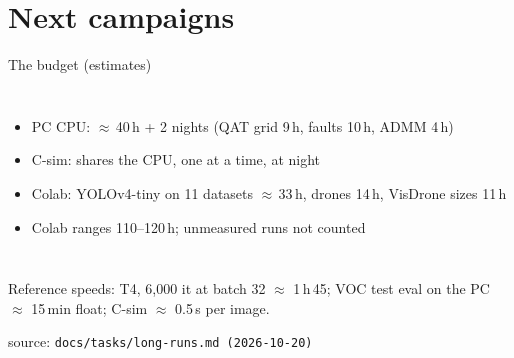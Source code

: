 \documentclass[aspectratio=169,11pt]{beamer}
\newcommand\src[1]{\par\vfill{\tiny\color{gray}source: \texttt{#1}}}
\newcommand\plan{\textcolor{orange!80!black}{\small(estimates)}}
\begin{document}
\section{Next campaigns}

\begin{frame}{The budget \plan}
  \begin{columns}[c]
    \centering
    \footnotesize
    \begin{itemize}
      \item PC CPU: $\approx$\,40\,h + 2 nights (QAT grid 9\,h, faults 10\,h, ADMM 4\,h)
      \item C-sim: shares the CPU, one at a time, at night
      \item Colab: YOLOv4-tiny on 11 datasets $\approx$\,33\,h, drones 14\,h, VisDrone sizes
        11\,h
      \item Colab ranges 110--120\,h; unmeasured runs not counted
    \end{itemize}
  \end{columns}
  \medskip\footnotesize
  Reference speeds: T4, 6,000 it at batch 32 $\approx$ 1\,h\,45; VOC test eval on the PC
  $\approx$ 15\,min float; C-sim $\approx$ 0.5\,s per image.
  \src{docs/tasks/long-runs.md (2026-10-20)}
\end{frame}
\end{document}
